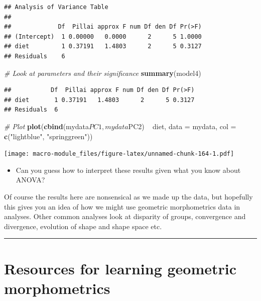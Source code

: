 \documentclass[]{book}
\newenvironment{Shaded}{\begin{snugshade}}{\end{snugshade}}
\newcommand{\KeywordTok}[1]{\textcolor[rgb]{0.13,0.29,0.53}{\textbf{{#1}}}}
\newcommand{\DataTypeTok}[1]{\textcolor[rgb]{0.13,0.29,0.53}{{#1}}}
\newcommand{\StringTok}[1]{\textcolor[rgb]{0.31,0.60,0.02}{{#1}}}
\newcommand{\CommentTok}[1]{\textcolor[rgb]{0.56,0.35,0.01}{\textit{{#1}}}}
\newcommand{\NormalTok}[1]{{#1}}
\providecommand{\tightlist}{%
  \setlength{\itemsep}{0pt}\setlength{\parskip}{0pt}}
\begin{document}
\begin{verbatim}
## Analysis of Variance Table
## 
##             Df  Pillai approx F num Df den Df Pr(>F)
## (Intercept)  1 0.00000   0.0000      2      5 1.0000
## diet         1 0.37191   1.4803      2      5 0.3127
## Residuals    6
\end{verbatim}

\begin{Shaded}
\begin{Highlighting}[]
\CommentTok{# Look at parameters and their significance}
\KeywordTok{summary}\NormalTok{(model4)}
\end{Highlighting}
\end{Shaded}

\begin{verbatim}
##           Df  Pillai approx F num Df den Df Pr(>F)
## diet       1 0.37191   1.4803      2      5 0.3127
## Residuals  6
\end{verbatim}

\begin{Shaded}
\begin{Highlighting}[]
\CommentTok{# Plot }
\KeywordTok{plot}\NormalTok{(}\KeywordTok{cbind}\NormalTok{(mydata$PC1,mydata$PC2) ~}\StringTok{ }\NormalTok{diet, }\DataTypeTok{data =} \NormalTok{mydata, }\DataTypeTok{col =} \KeywordTok{c}\NormalTok{(}\StringTok{"lightblue"}\NormalTok{, }\StringTok{"springgreen"}\NormalTok{))}
\end{Highlighting}
\end{Shaded}

\texttt{[image: macro-module\_files/figure-latex/unnamed-chunk-164-1.pdf]}

\begin{itemize}
\tightlist
\item
  Can you guess how to interpret these results given what you know about
  ANOVA?
\end{itemize}

Of course the results here are nonsensical as we made up the data, but
hopefully this gives you an idea of how we might use geometric
morphometrics data in analyses. Other common analyses look at disparity
of groups, convergence and divergence, evolution of shape and shape
space etc.

\begin{center}\rule{0.5\linewidth}{\linethickness}\end{center}

\section{Resources for learning geometric
morphometrics}\label{resources-for-learning-geometric-morphometrics}
\end{document}
